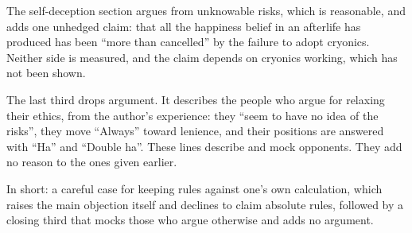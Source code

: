 \begin{afterword}
The self-deception section argues from unknowable risks, which is reasonable, and adds one unhedged claim: that all the happiness belief in an afterlife has produced has been ``more than cancelled'' by the failure to adopt cryonics. Neither side is measured, and the claim depends on cryonics working, which has not been shown.

The last third drops argument. It describes the people who argue for relaxing their ethics, from the author's experience: they ``seem to have no idea of the risks'', they move ``Always'' toward lenience, and their positions are answered with ``Ha'' and ``Double ha''. These lines describe and mock opponents. They add no reason to the ones given earlier.

In short: a careful case for keeping rules against one's own calculation, which raises the main objection itself and declines to claim absolute rules, followed by a closing third that mocks those who argue otherwise and adds no argument.
\end{afterword}
